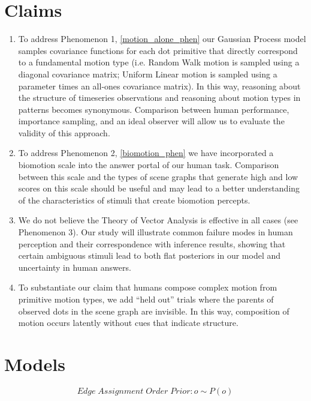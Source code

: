 \documentclass{scrartcl}
\begin{document}
\section{Claims}

\begin{enumerate}
  \item To address Phenomenon 1, \ref{motion_alone_phen} our Gaussian Process model samples covariance functions for each dot primitive that directly correspond to a fundamental motion type (i.e. Random Walk motion is sampled using a diagonal covariance matrix; Uniform Linear motion is sampled using a parameter times an all-ones covariance matrix). In this way, reasoning about the structure of timeseries observations and reasoning about motion types in patterns becomes synonymous. Comparison between human performance, importance sampling, and an ideal observer will allow us to evaluate the validity of this approach. 

  \item To address Phenomenon 2, \ref{biomotion_phen} we have incorporated a biomotion scale into the answer portal of our human task. Comparison between this scale and the types of scene graphs that generate high and low scores on this scale should be useful and may lead to a better understanding of the characteristics of stimuli that create biomotion percepts. 
  
  \item We do not believe the Theory of Vector Analysis is effective in all cases (see Phenomenon 3). Our study will illustrate common failure modes in human perception and their correspondence with inference results, showing that certain ambiguous stimuli lead to both flat posteriors in our model and uncertainty in human answers.

  \item To substantiate our claim that humans compose complex motion from primitive motion types, we add ``held out'' trials where the parents of observed dots in the scene graph are invisible. In this way, composition of motion occurs latently without cues that indicate structure. 

\end{enumerate}


\section{Models}

\begin{equation}
  Edge \; Assignment \; Order \; Prior: o \sim P(o)
\end{equation}
\end{document}
